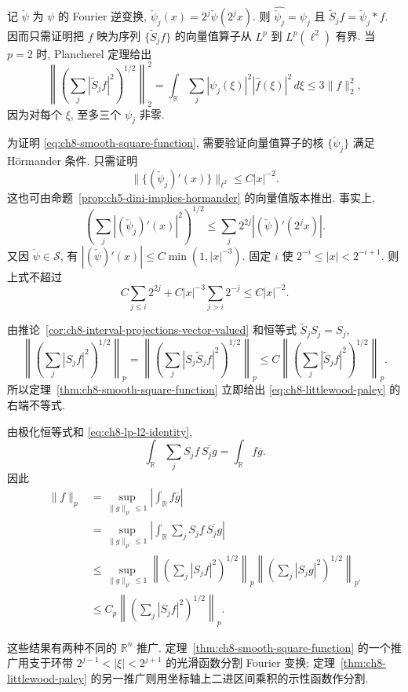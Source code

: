 \begin{Proof}
记 $\check\psi$ 为 $\psi$ 的 Fourier 逆变换, $\check\psi_j(x)=2^j\check\psi(2^jx)$. 则 $\widehat{\check\psi_j}=\psi_j$ 且 $\widetilde S_jf=\check\psi_j*f$. 因而只需证明把 $f$ 映为序列 $\{\widetilde S_jf\}$ 的向量值算子从 $L^p$ 到 $L^p(\ell^2)$ 有界. 当 $p=2$ 时, Plancherel 定理给出
\[
 \left\|\left(\sum_j|\widetilde S_jf|^2\right)^{1/2}\right\|_2^2
 =\int_{\mathbb R}\sum_j|\psi_j(\xi)|^2|\widehat f(\xi)|^2\,d\xi
 \le3\|f\|_2^2,
\]
因为对每个 $\xi$, 至多三个 $\psi_j$ 非零.

\hypertarget{chapter-08-page-173}{}
为证明 \eqref{eq:ch8-smooth-square-function}, 需要验证向量值算子的核 $\{\check\psi_j\}$ 满足 Hörmander 条件. 只需证明
\[
 \|\{(\check\psi_j)'(x)\}\|_{\ell^2}\le C|x|^{-2}.
\]
这也可由命题~\ref{prop:ch5-dini-implies-hormander} 的向量值版本推出. 事实上,
\[
 \left(\sum_j|(\check\psi_j)'(x)|^2\right)^{1/2}
 \le\sum_j2^{2j}|(\check\psi)'(2^jx)|.
\]
又因 $\check\psi\in\mathcal S$, 有 $|(\check\psi)'(x)|\le C\min(1,|x|^{-3})$. 固定 $i$ 使 $2^{-i}\le|x|<2^{-i+1}$. 则上式不超过
\[
 C\sum_{j\le i}2^{2j}+C|x|^{-3}\sum_{j>i}2^{-j}
 \le C|x|^{-2}.
\]
\end{Proof}

\begin{Proof}
由推论~\ref{cor:ch8-interval-projections-vector-valued} 和恒等式 $\widetilde S_jS_j=S_j$,
\[
 \left\|\left(\sum_j|S_jf|^2\right)^{1/2}\right\|_p
 =\left\|\left(\sum_j|S_j\widetilde S_jf|^2\right)^{1/2}\right\|_p
 \le C\left\|\left(\sum_j|\widetilde S_jf|^2\right)^{1/2}\right\|_p.
\]
所以定理~\ref{thm:ch8-smooth-square-function} 立即给出 \eqref{eq:ch8-littlewood-paley} 的右端不等式.

由极化恒等式和 \eqref{eq:ch8-lp-l2-identity},
\[
 \int_{\mathbb R}\sum_jS_jf\,\overline{S_jg}
 =\int_{\mathbb R}f\overline g.
\]
因此
\[
\begin{aligned}
 \|f\|_p
 &=\sup_{\|g\|_{p'}\le1}\left|\int_{\mathbb R}f\overline g\right|\\
 &=\sup_{\|g\|_{p'}\le1}\left|\int_{\mathbb R}\sum_jS_jf\,\overline{S_jg}\right|\\
 &\le\sup_{\|g\|_{p'}\le1}
 \left\|\left(\sum_j|S_jf|^2\right)^{1/2}\right\|_p
 \left\|\left(\sum_j|S_jg|^2\right)^{1/2}\right\|_{p'}\\
 &\le C_p\left\|\left(\sum_j|S_jf|^2\right)^{1/2}\right\|_p.
\end{aligned}
\]
\end{Proof}

这些结果有两种不同的 $\mathbb R^n$ 推广. 定理~\ref{thm:ch8-smooth-square-function} 的一个推广用支于环带 $2^{j-1}<|\xi|<2^{j+1}$ 的光滑函数分割 Fourier 变换; 定理~\ref{thm:ch8-littlewood-paley} 的另一推广则用坐标轴上二进区间乘积的示性函数作分割.

